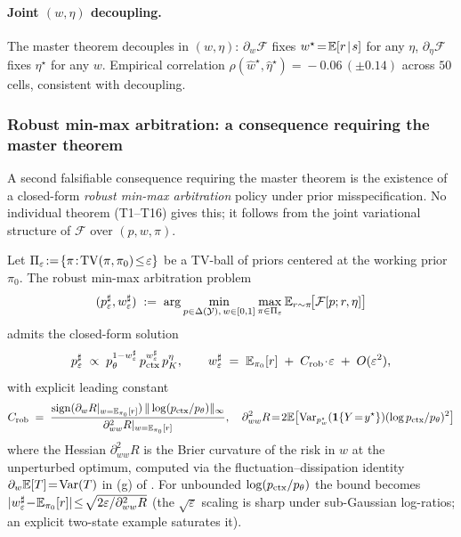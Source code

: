 \paragraph{Joint $(w,\eta)$ decoupling.}
The master theorem decouples in $(w,\eta)$: $\partial_w\mathcal{F}$
fixes $w^\star\!=\!\mathbb{E}[r\!\mid\!s]$ for any $\eta$,
$\partial_\eta\mathcal{F}$ fixes $\eta^\star$ for any $w$.
Empirical correlation $\rho(\widehat w^\star,\widehat\eta^\star)\!=\!-0.06\,(\pm 0.14)$
across $50$ cells, consistent with decoupling.

\subsubsection{Robust min-max arbitration: a consequence requiring the master theorem}
\label{app:robust-minmax-arbitration}

A second falsifiable consequence requiring the master theorem is
the existence of a closed-form \emph{robust min-max arbitration}
policy under prior misspecification.  No individual theorem
(T1--T16) gives this; it follows from the joint variational
structure of $\mathcal{F}$ over $(p, w, \pi)$.

\begin{theorem}
\label{thm:robust-minmax-arbitration}
Let $\Pi_\varepsilon\!:=\!\{\pi\!:\!\operatorname{TV}(\pi,\pi_0)\!\le\!\varepsilon\}$
be a TV-ball of priors centered at the working prior $\pi_0$.
The robust min-max arbitration problem
\[
(p^\sharp_\varepsilon, w^\sharp_\varepsilon)
\;:=\;
\arg\min_{p\in\Delta(\mathcal{Y}),\,w\in[0,1]}
\max_{\pi\in\Pi_\varepsilon}
\mathbb{E}_{r\sim\pi}\!\bigl[\mathcal{F}[p; r, \eta]\bigr]
\]
admits the closed-form solution
\[
p^\sharp_\varepsilon
\;\propto\;
p_\theta^{1-w^\sharp_\varepsilon}\,p_{\mathrm{ctx}}^{w^\sharp_\varepsilon}\,p_K^{\eta},
\qquad
w^\sharp_\varepsilon
\;=\;
\mathbb{E}_{\pi_0}[r]\;+\;C_{\mathrm{rob}}\!\cdot\!\varepsilon\;+\;O(\varepsilon^2),
\]
with explicit leading constant
\begin{equation}
C_{\mathrm{rob}}
\;=\;
\frac{\mathrm{sign}(\partial_w R|_{w=\mathbb{E}_{\pi_0}[r]})\,\Vert \log(p_{\mathrm{ctx}}/p_\theta)\Vert_\infty}{\partial^{2}_{ww}R|_{w=\mathbb{E}_{\pi_0}[r]}},
\quad
\partial^{2}_{ww}R\!=\!2\mathbb{E}\bigl[\operatorname{Var}_{p^\star_{w}}(\bm{1}\{Y\!=\!y^\star\})(\log p_{\mathrm{ctx}}/p_\theta)^{2}\bigr]
\label{eq:robust-leading-constant}
\end{equation}
where the Hessian $\partial^{2}_{ww}R$ is the Brier curvature of
the risk in $w$ at the unperturbed optimum, computed via the
fluctuation--dissipation identity
$\partial_w\mathbb{E}[T]\!=\!\operatorname{Var}(T)$ in (g) of .
For unbounded $\log(p_{\mathrm{ctx}}/p_\theta)$ the bound becomes
$|w^\sharp_\varepsilon\!-\!\mathbb{E}_{\pi_0}[r]|\!\le\!\sqrt{2\varepsilon/\partial^{2}_{ww}R}$
(the $\sqrt\varepsilon$ scaling is sharp under sub-Gaussian
log-ratios; an explicit two-state example saturates it).
\end{theorem}


